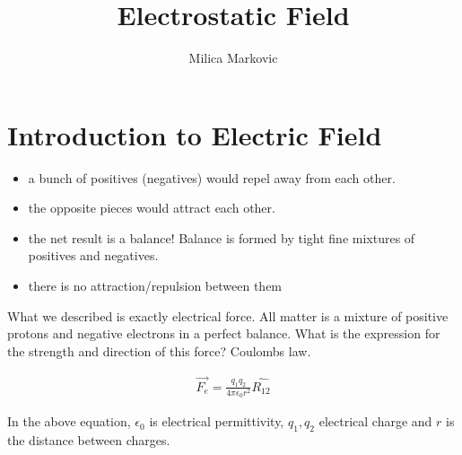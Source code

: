 \documentclass{ximera}
\title{Electrostatic Field}
\author{Milica Markovic}
\begin{document}
  
\begin{abstract}  

\end{abstract}  
\maketitle    


\section{Introduction to Electric Field}


\begin{itemize}
\item a bunch of positives (negatives) would repel away from each other.
\item the opposite pieces would attract each other.
\item the net result is a balance! Balance is formed by tight fine mixtures of positives and negatives.
\item there is no attraction/repulsion between them
\end{itemize}
 

What we described is exactly electrical force. All matter is a mixture of positive protons and negative electrons in a perfect balance. What is the expression for the strength and direction of this force? Coulombs law.

\begin{eqnarray}
\vec{F_e}=\frac{q_1 q_2}{4 \pi \epsilon_0 r^2} \hat{R_{12}}
\end{eqnarray}\label{Coulombslaw}

In the above equation, $\epsilon_0$ is electrical permittivity, $q_1,q_2$ electrical charge and $r$ is the distance between charges.
\end{document}
